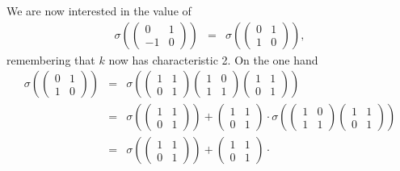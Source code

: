 We are now interested in the value of
\begin{eqnarray*}
\sigma\left(
	\left(\begin{matrix} 0 & 1 \\ -1 & 0 \end{matrix}\right)
\right) &=&
\sigma\left(
	\left(\begin{matrix} 0 & 1 \\ 1 & 0 \end{matrix}\right)
\right),
\end{eqnarray*}
remembering that $k$ now has characteristic 2. On the one hand
\begin{eqnarray*}
\sigma\left(
	\left(\begin{matrix} 0 & 1 \\ 1 & 0 \end{matrix}\right)
\right) &=&
\sigma\left(
	\left(\begin{matrix} 1 & 1 \\ 0 & 1 \end{matrix}\right)
	\left(\begin{matrix} 1 & 0 \\ 1 & 1 \end{matrix}\right)
	\left(\begin{matrix} 1 & 1 \\ 0 & 1 \end{matrix}\right)
\right) \\
&=&
\sigma\left(
	\left(\begin{matrix} 1 & 1 \\ 0 & 1 \end{matrix}\right)
\right) +
\left(\begin{matrix} 1 & 1 \\ 0 & 1 \end{matrix}\right) \cdot
\sigma\left(
	\left(\begin{matrix} 1 & 0 \\ 1 & 1 \end{matrix}\right)
	\left(\begin{matrix} 1 & 1 \\ 0 & 1 \end{matrix}\right)
\right) \\ 
&=&
\sigma\left(
	\left(\begin{matrix} 1 & 1 \\ 0 & 1 \end{matrix}\right)
\right) +
\left(\begin{matrix} 1 & 1 \\ 0 & 1 \end{matrix}\right) \cdot

\end{eqnarray*}
